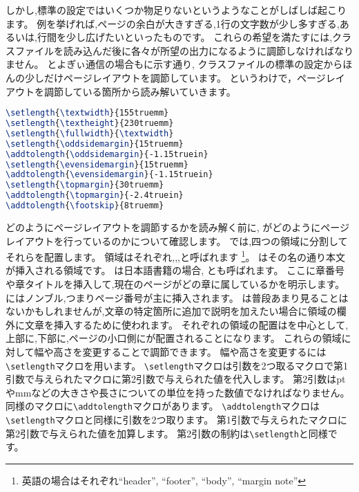 しかし,標準の設定ではいくつか物足りないというようなことがしばしば起こります。
例を挙げれば,ページの余白が大きすぎる,1行の文字数が少し多すぎる,あるいは,行間を少し広げたいといったものです。
これらの希望を満たすには,クラスファイルを読み込んだ後に各々が所望の出力になるように調節しなければなりません。
とよぎぃ通信の場合もに示す通り,
クラスファイルの標準の設定からほんの少しだけページレイアウトを調節しています。
というわけで，ページレイアウトを調節している箇所から読み解いていきます。
\begin{lstlisting}[caption = ページレイアウトの調節,label = list:layout,language = tex]
\setlength{\textwidth}{155truemm}
\setlength{\textheight}{230truemm}
\setlength{\fullwidth}{\textwidth}
\setlength{\oddsidemargin}{15truemm}
\addtolength{\oddsidemargin}{-1.15truein}
\setlength{\evensidemargin}{15truemm}
\addtolength{\evensidemargin}{-1.15truein}
\setlength{\topmargin}{30truemm}
\addtolength{\topmargin}{-2.4truein}
\addtolength{\footskip}{8truemm}
\end{lstlisting}

どのようにページレイアウトを調節するかを読み解く前に,
{\pLaTeX}がどのようにページレイアウトを行っているのかについて確認します。
{\pLaTeX}では,四つの領域に分割してそれらを配置します。
領域はそれぞれ,,,と呼ばれます
\footnote{英語の場合はそれぞれ``header'', ``footer'', ``body'', ``margin note''}。
はその名の通り本文が挿入される領域です。
は日本語書籍の場合, とも呼ばれます。
ここに章番号や章タイトルを挿入して,現在のページがどの章に属しているかを明示します。
にはノンブル,つまりページ番号が主に挿入されます。
は普段あまり見ることはないかもしれませんが,文章の特定箇所に追加で説明を加えたい場合に領域の欄外に文章を挿入するために使われます。
それぞれの領域の配置はを中心として,\,上部に,下部に,ページの小口側にが配置されることになります。
これらの領域に対して幅や高さを変更することで調節できます。
幅や高さを変更するには\verb|\setlength|マクロを用います。
\verb|\setlength|マクロは引数を2つ取るマクロで第1引数で与えられたマクロに第2引数で与えられた値を代入します。
第2引数はptやmmなどの大きさや長さについての単位を持った数値でなければなりません。
同様のマクロに\verb|\addtolength|マクロがあります。
\verb|\addtolength|マクロは\verb|\setlength|マクロと同様に引数を2つ取ります。
第1引数で与えられたマクロに第2引数で与えられた値を加算します。
第2引数の制約は\verb|\setlength|と同様です。

